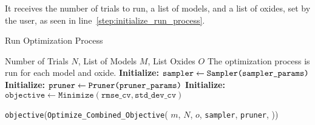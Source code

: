 It receives the number of trials to run, a list of models, and a list of oxides, set by the user, as seen in line~\ref{step:initialize_run_process}.
\begin{algorithm}
\caption{Run Optimization Process}
\label{alg:study_function}
\begin{algorithmic}[1]
\Require Number of Trials $N$, List of Models $M$, List Oxides $O$ \label{step:initialize_run_process}
\Ensure The optimization process is run for each model and oxide. 
\State \textbf{Initialize:} $\texttt{sampler} \gets \texttt{Sampler(\texttt{sampler\_params})}$ \label{step:initialize_sampler}
\State \textbf{Initialize:} $\texttt{pruner} \gets \texttt{Pruner(\texttt{pruner\_params})}$ \label{step:initialize_pruner}
\State \textbf{Initialize:} $\texttt{objective} \gets \texttt{Minimize}(\texttt{rmse\_cv}, \texttt{std\_dev\_cv})$ \label{step:initialize_objective}

 \label{step:oxide_loop}
     \label{step:model_loop}
        \State \texttt{objective}(\texttt{Optimize\_Combined\_Objective}(
        \State \hspace{1.5em} $m$,
        \State \hspace{1.5em} $N$,
        \State \hspace{1.5em} $o$,
        \State \hspace{1.5em} \texttt{sampler},
        \State \hspace{1.5em} \texttt{pruner},
        \State )) \label{step:optimize_combined_objective}
    \EndFor
\EndFor
\end{algorithmic}
\end{algorithm}

